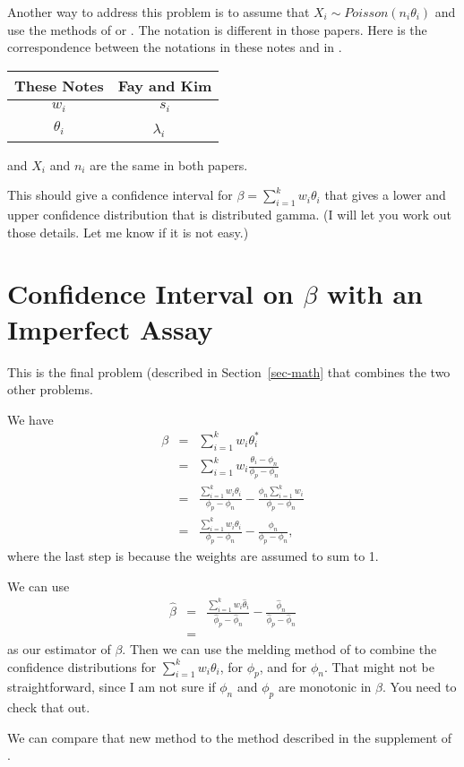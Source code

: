 \documentclass{article}
\begin{document}
Another way to address this problem is to assume that $X_i \sim Poisson( n_i \theta_i)$ and use the methods
of \citet{FayF:1997} or \citet{FayK:2017}.
The notation is different in those papers. Here is the correspondence between the notations in these notes and in \citet{FayK:2017}.

\begin{tabular}{cc}
These Notes & Fay and Kim  \\ \hline
$w_i$     & $s_i$ \\
$\theta_i$ & $\lambda_i$ \
\end{tabular}

and $X_i$ and $n_i$ are the same in both papers. 


This should give a confidence interval for $\beta=\sum_{i=1}^{k} w_i \theta_i$
that gives a lower and upper confidence distribution that is distributed gamma. (I will let you work out those details. Let me know if it is not easy.)


\section{Confidence Interval on $\beta$ with an Imperfect Assay}
\label{sec-betaImperfect}

This is the final problem (described in Section~\ref{sec-math} that combines the two other problems.

We have
\begin{eqnarray*}
\beta & = & \sum_{i=1}^{k} w_i \theta_i^*  \\
& = &  \sum_{i=1}^{k} w_i  \frac{ \theta_i - \phi_n }{ \phi_p - \phi_n} \\
& = &   \frac{ \sum_{i=1}^{k} w_i  \theta_i  }{ \phi_p - \phi_n} - \frac{ \phi_n \sum_{i=1}^{k} w_i    }{ \phi_p - \phi_n} \\
& = &   \frac{ \sum_{i=1}^{k} w_i  \theta_i  }{ \phi_p - \phi_n} - \frac{ \phi_n     }{ \phi_p - \phi_n},
\end{eqnarray*}
where the last step is because the weights are assumed to sum to 1.

We can use
\begin{eqnarray*}
\hat{\beta} & = &   \frac{ \sum_{i=1}^{k} w_i  \hat{\theta}_i  }{ \hat{\phi}_p - \hat{\phi}_n} - \frac{ \hat{\phi}_n   }{ \hat{\phi}_p - \hat{\phi}_n} \\
& = &
\end{eqnarray*}
as our estimator of $\beta$. Then we can use the melding method of \citet{FayP:2015} to combine the confidence distributions for $\sum_{i=1}^{k} w_i  {\theta}_i$, for $\phi_p$,
and for $\phi_n$. That might not be straightforward, since I am not sure if $\phi_n$ and $\phi_p$ are monotonic in $\beta$. You need to check that out.


We can compare that new method to the method described in the supplement of \citet{Kali:2021}.




%




\end{document}
